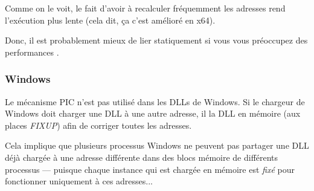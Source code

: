 Comme on le voit, le fait d'avoir à recalculer fréquemment les adresses rend l'exécution plus lente
(cela dit, ça c'est amélioré en x64).

Donc, il est probablement mieux de lier statiquement si vous vous préoccupez des performances .

\subsubsection{Windows}

Le mécanisme PIC n'est pas utilisé dans les DLLs de Windows. Si le chargeur de Windows doit charger une DLL
à une autre adresse, il  la DLL en mémoire (aux places \emph{FIXUP}) afin de corriger toutes les
adresses.

Cela implique que plusieurs processus Windows ne peuvent pas partager une DLL déjà chargée à une adresse différente
dans des blocs mémoire de différents processus --- puisque chaque instance qui est chargée en mémoire est \emph{fixé} pour 
fonctionner uniquement à ces adresses...

